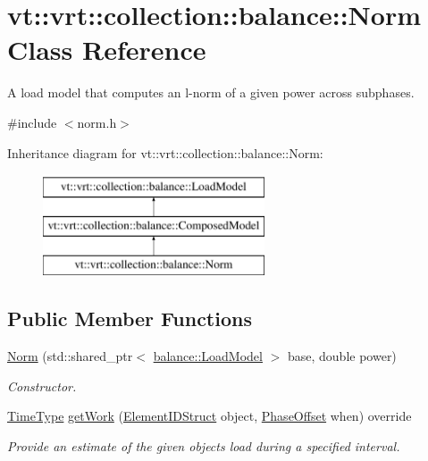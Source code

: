 \hypertarget{classvt_1_1vrt_1_1collection_1_1balance_1_1_norm}{}\section{vt\+:\+:vrt\+:\+:collection\+:\+:balance\+:\+:Norm Class Reference}
\label{classvt_1_1vrt_1_1collection_1_1balance_1_1_norm}


A load model that computes an l-\/norm of a given power across subphases.  




{\ttfamily \#include $<$norm.\+h$>$}

Inheritance diagram for vt\+:\+:vrt\+:\+:collection\+:\+:balance\+:\+:Norm\+:\begin{figure}[H]
\begin{center}
\leavevmode
\includegraphics[height=3.000000cm]{classvt_1_1vrt_1_1collection_1_1balance_1_1_norm}
\end{center}
\end{figure}
\subsection*{Public Member Functions}
\begin{DoxyCompactItemize}
\item 
\hyperlink{classvt_1_1vrt_1_1collection_1_1balance_1_1_norm_a054625ebe2a8dcd9f986f36f40b70ada}{Norm} (std\+::shared\+\_\+ptr$<$ \hyperlink{classvt_1_1vrt_1_1collection_1_1balance_1_1_load_model}{balance\+::\+Load\+Model} $>$ base, double power)
\begin{DoxyCompactList}\small\item\em Constructor. \end{DoxyCompactList}\item 
\hyperlink{namespacevt_a876a9d0cd5a952859c72de8a46881442}{Time\+Type} \hyperlink{classvt_1_1vrt_1_1collection_1_1balance_1_1_norm_ae703c9f02a514a1d7f130daea2367566}{get\+Work} (\hyperlink{structvt_1_1vrt_1_1collection_1_1balance_1_1_element_i_d_struct}{Element\+I\+D\+Struct} object, \hyperlink{structvt_1_1vrt_1_1collection_1_1balance_1_1_phase_offset}{Phase\+Offset} when) override
\begin{DoxyCompactList}\small\item\em Provide an estimate of the given object\textquotesingle{}s load during a specified interval. \end{DoxyCompactList}\end{DoxyCompactItemize}
